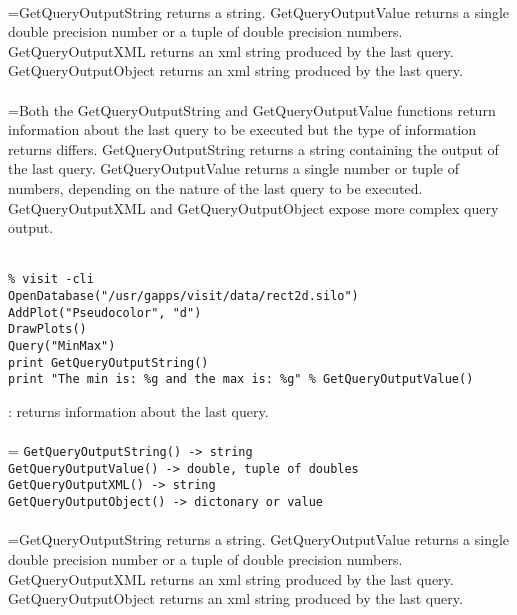 \documentclass[10pt,a4paper]{report}
\begin{document}
 \\ 
\hangindent=\parindent GetQueryOutputString returns a string. GetQueryOutputValue returns a single double precision number or a tuple of double precision numbers. GetQueryOutputXML returns an xml string produced by the last query. GetQueryOutputObject returns an xml string produced by the last query. \\[-3mm] 

 \\ 
\hangindent=\parindent Both the GetQueryOutputString and GetQueryOutputValue functions return information about the last query to be executed but the type of information returns differs. GetQueryOutputString returns a string containing the output of the last query. GetQueryOutputValue returns a single number or tuple of numbers, depending on the nature of the last query to be executed.  GetQueryOutputXML and GetQueryOutputObject expose more complex query output. \\[-3mm] 

\\[-6mm]
\begin{verbatim}% visit -cli
OpenDatabase("/usr/gapps/visit/data/rect2d.silo")
AddPlot("Pseudocolor", "d")
DrawPlots()
Query("MinMax")
print GetQueryOutputString()
print "The min is: %g and the max is: %g" % GetQueryOutputValue()
\end{verbatim}
\newpage


{}
: returns information about the last query.\\[-3mm]

 \\ 
\hangindent=\parindent 
\verb!GetQueryOutputString() -> string!\\ 
\verb!GetQueryOutputValue() -> double, tuple of doubles!\\ 
\verb!GetQueryOutputXML() -> string!\\ 
\verb!GetQueryOutputObject() -> dictonary or value!\\ [-3mm]

 \\ 
\hangindent=\parindent GetQueryOutputString returns a string. GetQueryOutputValue returns a single double precision number or a tuple of double precision numbers. GetQueryOutputXML returns an xml string produced by the last query. GetQueryOutputObject returns an xml string produced by the last query. \\[-3mm] 
\end{document}
